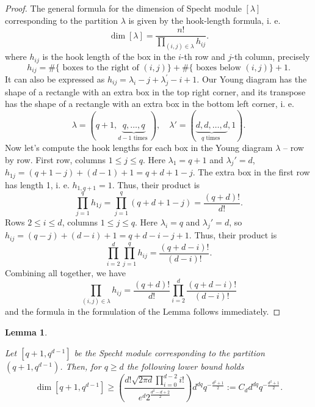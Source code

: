 \documentclass[11pt,letterpaper]{article}
\theoremstyle{plain}
\theoremstyle{plain}
\theoremstyle{plain}
\theoremstyle{plain}
\theoremstyle{plain}
\theoremstyle{plain}
\theoremstyle{plain}
\newtheorem{smlemma}[smtheorem]{Lemma}
\theoremstyle{definition}
\theoremstyle{plain}
\begin{document}
\begin{proof}
    The general formula for the dimension of Specht module $[\lambda]$ corresponding to the partition $\lambda$ is given by the hook-length formula, i. e.
    \[
        \operatorname{dim} [\lambda] = \frac{n!}{\prod_{(i, j) \in \lambda} h_{i j}} .
    \]
    where $h_{ij}$ is the hook length of the box in the $i$-th row and $j$-th column, precisely
    \[
        h_{i j}=\#\{\text { boxes to the right of }(i, j)\}+\#\{\text { boxes below }(i, j)\}+1 .
    \]
    It can also be expressed as
    $
        h_{i j}=\lambda_i-j+\lambda_j^{\prime}-i+1 .
    $
    Our Young diagram has the shape of a rectangle with an extra box in the top right corner, and its transpose 
    has the shape of a rectangle with an extra box in the bottom left corner, i. e.
    $$
        \lambda=(q+1, \underbrace{q, \ldots, q}_{d-1 \text { times }}), \quad \lambda'=(\underbrace{d, d, \ldots, d}_{q \text { times }}, 1).
    $$
    Now let's compute the hook lengths for each box in the Young diagram $\lambda$ -- row by row.
    First row, columns $1 \leq j \leq q$. Here $\lambda_1 = q+1$ and $\lambda_j'=d$, 
    $
        h_{1 j}=(q+1-j)+(d-1)+1=q+d+1-j.
    $
    The extra box in the first row has length 1, i. e. 
    $
        h_{1, q+1}=1.
    $
    Thus, their product is
    \[
        \prod_{j=1}^q h_{1 j}=\prod_{j=1}^q(q+d+1-j)=\frac{(q+d)!}{d!} .
    \]
    Rows $2 \leq i \leq d$, columns $1 \leq j \leq q$. Here $\lambda_i=q$ and $\lambda_j'=d$, so
    $
        h_{i j}=(q-j)+(d-i)+1=q+d-i-j+1 .
    $
    Thus, their product is
    \[
       \prod_{i=2}^d \prod_{j=1}^q h_{i j}=\frac{(q+d-i)!}{(d-i)!}.
    \]
    Combining all together, we have
    \[
        \prod_{(i, j) \in \lambda} h_{i j}=\frac{(q+d)!}{d!} \prod_{i=2}^d \frac{(q+d-i)!}{(d-i)!}
    \]
    and the formula in the formulation of the Lemma follows immediately.

\end{proof}

\begin{smlemma}\label{lem:dimension_bound}

Let $[q+1, q^{d-1}]$ be the Specht module corresponding to the partition $(q+1, q^{d-1})$. 
Then, for $q\geq d$ the following lower bound holds
\[
    \operatorname{dim} [q+1, q^{d-1}] \geq \left(\frac{d!\sqrt{2 \pi d}\prod_{i=0}^{d-2} i!}{e^d 2^{\frac{d^2-d+2}{2}}} \right) d^{d q} q^{-\frac{d^2+1}{2}} := C_d d^{d q} q^{-\frac{d^2+1}{2}}.
\]

\end{smlemma}
\end{document}
